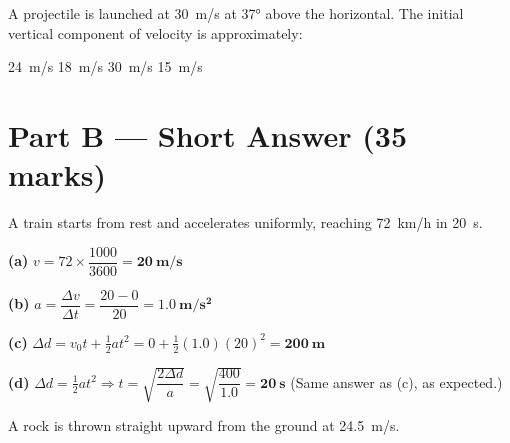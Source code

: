 \documentclass[addpoints]{exam}
\begin{document}
\begin{questions}
\question[1] A projectile is launched at \SI{30}{m/s} at \ang{37} above the horizontal.
The initial vertical component of velocity is approximately:
\begin{choices}
    \choice \SI{24}{m/s}
    \correctchoice \SI{18}{m/s}
    \choice \SI{30}{m/s}
    \choice \SI{15}{m/s}
\end{choices}


\section*{Part B --- Short Answer (35 marks)}

\question A train starts from rest and accelerates uniformly, reaching \SI{72}{km/h}
in \SI{20}{s}.
\begin{solution}[10cm]
\textbf{(a)} $v = 72 \times \dfrac{1000}{3600} = \mathbf{\SI{20}{m/s}}$

\textbf{(b)} $a = \dfrac{\Delta v}{\Delta t} = \dfrac{20 - 0}{20} = \mathbf{\SI{1.0}{m/s^2}}$

\textbf{(c)} $\Delta d = v_0 t + \tfrac{1}{2}at^2 = 0 + \tfrac{1}{2}(1.0)(20)^2
= \mathbf{\SI{200}{m}}$

\textbf{(d)} $\Delta d = \tfrac{1}{2}at^2 \Rightarrow t = \sqrt{\dfrac{2\Delta d}{a}}
= \sqrt{\dfrac{400}{1.0}} = \mathbf{\SI{20}{s}}$
(Same answer as (c), as expected.)
\end{solution}

\question A rock is thrown straight upward from the ground at \SI{24.5}{m/s}.
\begin{parts}

\end{parts}
\end{questions}
\end{document}
